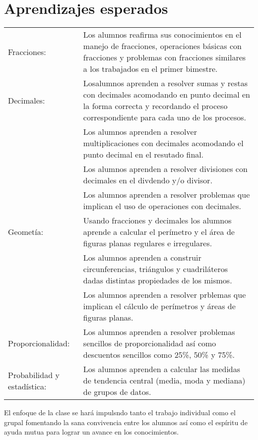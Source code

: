 \documentclass[letterpaper,10pt]{article}
\begin{document}
\section{Aprendizajes esperados}
\begin{tabular}[t]{R{0.25\textwidth}p{0.71\textwidth}}
Fracciones:     & Los alumnos reafirma sus conocimientos en el manejo de
fracciones, operaciones b\'asicas con fracciones y problemas con fracciones
similares a los trabajados en el primer bimestre. \\ 
Decimales:      & Losalumnos aprenden a resolver sumas y restas con decimales
                acomodando en punto decimal en la forma correcta y recordando el
                proceso correspondiente para cada uno de los procesos. \\
                & Los alumnos aprenden a resolver multiplicaciones con decimales
                acomodando el punto decimal en el resutado final. \\
                & Los alumnos aprenden a resolver divisiones con decimales en el
                divdendo y/o divisor. \\
                & Los alumnos aprenden a resolver problemas que implican el uso
                de operaciones con decimales. \\
Geomet\'ia:     & Usando fracciones y decimales los alumnos aprende a calcular 
                el per\'imetro y el \'area de figuras planas regulares e 
                irregulares. \\
                & Los alumnos aprenden a construir circunferencias, tri\'angulos 
                y cuadril\'ateros dadas distintas propiedades de los mismos. \\
                & Los alumnos aprenden a resolver prblemas que implican el
                c\'alculo de per\'imetros y \'areas de figuras planas. \\
Proporcionalidad: 
                & Los alumnos aprenden a resolver problemas sencillos de
                proporcionalidad as\'i como descuentos sencillos como 25\%, 50\%
                y 75\%. \\
Probabilidad y estad\'istica:
                & Los alumnos aprenden a calcular las medidas de tendencia 
                central (media, moda y mediana) de grupos de datos.
\end{tabular}

\vspace{5mm}

El enfoque de la clase se har\'a impulsndo tanto el trabajo individual como el 
grupal fomentando la sana convivencia entre los alumnos as\'i como el esp\'iritu
de ayuda mutua para lograr un avance en los conocimientos.
\end{document}
